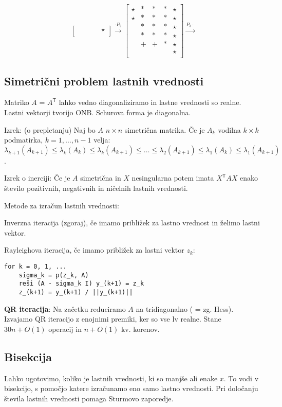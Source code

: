 \documentclass[a4paper,10pt]{article}
\theoremstyle{definition}
\newcommand{\T}{\mathsf{T}\!}
\begin{document}
\[\begin{bmatrix}
        &       &       &       & \star \\
\end{bmatrix}
\xrightarrow{\cdot P_2}
\begin{bmatrix}
  \star & * & * & * & \star \\
  \star & * & * & * & \star \\
        & * & * & * & \star  \\
        & * & * & * & \star  \\
        & + & + & * & \star \\
        &   &   &   & \star \\
\end{bmatrix}
\xrightarrow{P_3 \cdot}
\]

\subsection*{Simetrični problem lastnih vrednosti}
Matriko $A$ = $A^\T$ lahko vedno diagonaliziramo in lastne vrednosti so realne.
Lastni vektorji tvorijo ONB. Schurova forma je diagonalna.

Izrek: (o prepletanju)
Naj bo $A$ $n \times n$ simetrična matrika. Če je $A_k$ vodilna $k \times k$
podmatirka, $k = 1, \dots, n-1$ velja: $\lambda_{k+1}(A_{k+1}) \leq
\lambda_k(A_k) \leq \lambda_k(A_{k+1}) \leq \dots \leq \lambda_2(A_{k+1}) \leq
\lambda_1(A_k) \leq \lambda_1(A_{k+1})$.

Izrek o inerciji: Če je $A$ simetrična in $X$ nesingularna potem imata $X^\T A
X$ enako število pozitivnih, negativnih in ničelnih lastnih vrednosti.

Metode za izračun lastnih vrednosti:

Inverzna iteracija (zgoraj), če imamo približek za lastno vrednost in želimo
lastni vektor.

Rayleighova iteracija, če imamo približek za lastni vektor $z_k$:
\begin{verbatim}
for k = 0, 1, ...
    sigma_k = p(z_k, A)
    reši (A - sigma_k I) y_(k+1) = z_k
    z_(k+1) = y_(k+1) / ||y_(k+1)||
\end{verbatim}

\textbf{QR iteracija}: Na začetku reduciramo $A$ na tridiagonalno ( = zg. Hess). Izvajamo
QR iteracijo z enojnimi premiki, ker so vse lv realne. Stane $30n + O(1)$
operacij in $n + O(1)$ kv. korenov.

\subsection*{Bisekcija}
Lahko ugotovimo, koliko je lastnih vrednosti, ki so manjše ali enake $x$. To
vodi v bisekcijo, s pomočjo katere izračunamo eno samo lastno vrednosti. Pri
določanju števila lastnih vrednosti pomaga Sturmovo zaporedje.
\end{document}
